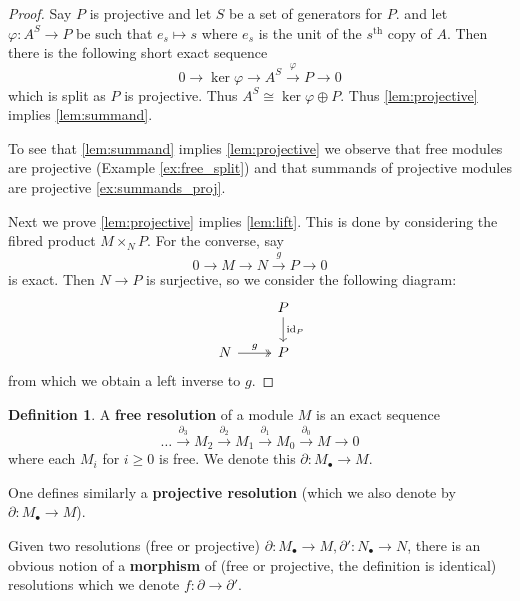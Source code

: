 \documentclass[12pt]{article}
\theoremstyle{plain}
\theoremstyle{definition}
\newtheorem{defn}[thm]{Definition} %
\newcommand{\lto}{\longrightarrow}
\begin{document}
\begin{proof}
Say $P$ is projective and let $S$ be a set of generators for $P$. and let $\varphi: A^S \lto P$ be such that $e_s \longmapsto s$ where $e_s$ is the unit of the $s^{\text{th}}$ copy of $A$. Then there is the following short exact sequence
\begin{equation}
0 \lto \operatorname{ker}\varphi \lto A^S \stackrel{\varphi}{\lto} P \lto 0
\end{equation}
which is split as $P$ is projective. Thus $A^S \cong \operatorname{ker}\varphi \oplus P$. Thus \eqref{lem:projective} implies \eqref{lem:summand}.

To see that \eqref{lem:summand} implies \eqref{lem:projective} we observe that free modules are projective (Example \ref{ex:free_split}) and that summands of projective modules are projective \eqref{ex:summands_proj}.

Next we prove \eqref{lem:projective} implies \eqref{lem:lift}.  This is done by considering the fibred product $M \times_N P$. For the converse, say
\begin{equation}
0 \lto M \lto N \stackrel{g}{\lto} P \lto 0
\end{equation}
is exact. Then $N \lto P$ is surjective, so we consider the following diagram:
\begin{equation}
\begin{tikzcd}
& P\arrow[d,"{\operatorname{id}_P}"]\\
N\arrow[r,twoheadrightarrow,"g"] & P
\end{tikzcd}
\end{equation}
from which we obtain a left inverse to $g$.
\end{proof}
\begin{defn}
A \textbf{free resolution} of a module $M$ is an exact sequence
\begin{equation}
\hdots \stackrel{\partial_3}{\lto} M_2 \stackrel{\partial_2}{\lto} M_1 \stackrel{\partial_1}{\lto} M_0 \stackrel{\partial_0}{\lto}M \lto 0
\end{equation}
where each $M_i$ for $i \geq 0$ is free. We denote this $\partial: M_\bullet \lto M$.

One defines similarly a \textbf{projective resolution} (which we also denote by $\partial: M_\bullet \lto M$).

Given two resolutions (free or projective) $\partial: M_{\bullet} \lto M, \partial': N_{\bullet} \lto N$, there is an obvious notion of a \textbf{morphism} of (free or projective, the definition is identical) resolutions which we denote $f: \partial \lto \partial'$.
\end{defn}
\end{document}
